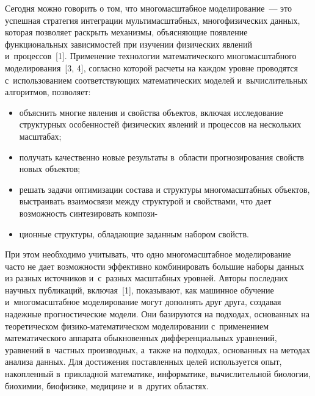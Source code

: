 \begin{multicols}{2}
Сегодня можно говорить о том, что многомасштабное моделирование~--- 
    это успешная стратегия интеграции мультимасштабных, многофизических 
данных, которая позволяет раскрыть механизмы, объясняющие появление 
функциональных зависимостей при изучении физических явлений 
и~процессов~[1]. Применение технологии математического многомасштабного 
моделирования~[3, 4], согласно которой расчеты на каждом уровне проводятся 
с~использованием соответствующих математических моделей и~вычислительных 
алгоритмов, позволяет:\\[-15pt]
    \begin{itemize}
     \item объяснить многие явления и свойства объектов, включая 
исследование структурных особенностей физических явлений и процессов на 
нескольких масштабах;\\[-15pt]
     \item получать качественно новые результаты в~об\-ласти прогнозирования 
свойств новых объектов;\\[-15pt]
     \item решать задачи оптимизации состава и структуры многомасштабных 
объектов, выстраивать взаимосвязи между структурой и свойствами, что дает 
возможность синтезировать компози-\linebreak\vspace*{-12pt}
\end{itemize}

\pagebreak

\begin{itemize}
\item[ ] 
ционные структуры, обладающие заданным 
набором свойств.
    \end{itemize}
        При этом необходимо учитывать, что одно многомасштабное 
моделирование часто не дает возможности эффективно комбинировать большие 
наборы данных из разных источников и~с~разных \mbox{масштабных} уровней. Авторы 
последних научных пуб\-ли\-ка\-ций, включая~[1], показывают, как машинное 
обучение и~многомасштабное моделирование могут дополнять друг друга, 
создавая надежные прогностические модели. Они базируются на подходах, 
основанных на теоретическом фи\-зи\-ко-ма\-те\-ма\-ти\-че\-ском моделировании 
с~применением \mbox{математического} аппарата обыкновенных дифференциальных 
уравнений, уравнений в~част\-ных производных, а~также на подходах, 
основанных на методах анализа данных. Для достижения поставленных целей 
используется опыт, накопленный в~прикладной математике, информатике, 
вычислительной биологии, биохимии, биофизике, медицине и~в~других 
областях.
    

\end{multicols}
